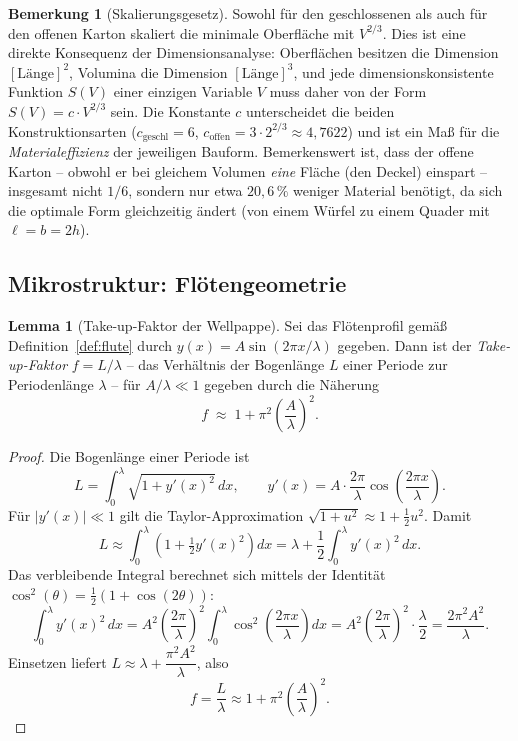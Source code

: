 ﻿\documentclass[a4paper,12pt]{article}
\theoremstyle{definition}
\newtheorem{lemma}{Lemma}
\newtheorem{bemerkung}{Bemerkung}
\begin{document}
\begin{bemerkung}[Skalierungsgesetz]
	Sowohl für den geschlossenen als auch für den offenen Karton skaliert die
	minimale Oberfläche mit $V^{2/3}$. Dies ist eine direkte Konsequenz der
	Dimensionsanalyse: Oberflächen besitzen die Dimension $[\text{Länge}]^2$,
	Volumina die Dimension $[\text{Länge}]^3$, und jede dimensionskonsistente
	Funktion $S(V)$ einer einzigen Variable $V$ muss daher von der Form
	$S(V) = c \cdot V^{2/3}$ sein. Die Konstante $c$ unterscheidet die beiden
	Konstruktionsarten ($c_{\mathrm{geschl}} = 6$, $c_{\mathrm{offen}} = 3 \cdot
	2^{2/3} \approx 4{,}7622$) und ist ein Maß für die \emph{Materialeffizienz}
	der jeweiligen Bauform. Bemerkenswert ist, dass der offene Karton -- obwohl
	er bei gleichem Volumen \emph{eine} Fläche (den Deckel) einspart --
	insgesamt nicht $1/6$, sondern nur etwa $20{,}6\,\%$ weniger Material
	benötigt, da sich die optimale Form gleichzeitig ändert (von einem Würfel zu
	einem Quader mit $\ell = b = 2h$).
\end{bemerkung}

\subsection{Mikrostruktur: Flötengeometrie}

\begin{lemma}[Take-up-Faktor der Wellpappe]
	\label{lem:takeup}
	Sei das Flötenprofil gemäß Definition~\ref{def:flute} durch
	$y(x) = A\sin(2\pi x/\lambda)$ gegeben. Dann ist der
	\emph{Take-up-Faktor} $f = L/\lambda$ -- das Verhältnis der Bogenlänge $L$
	einer Periode zur Periodenlänge $\lambda$ -- für $A/\lambda \ll 1$ gegeben
	durch die Näherung
	\[
		f \;\approx\; 1 + \pi^2 \left(\frac{A}{\lambda}\right)^2.
	\]
\end{lemma}

\begin{proof}
	Die Bogenlänge einer Periode ist
	\[
		L = \int_0^\lambda \sqrt{1 + y'(x)^2}\,dx, \qquad
		y'(x) = A \cdot \frac{2\pi}{\lambda}\cos\!\left(\frac{2\pi x}{\lambda}\right).
	\]
	Für $|y'(x)| \ll 1$ gilt die Taylor-Approximation
	$\sqrt{1+u^2} \approx 1 + \tfrac{1}{2}u^2$. Damit
	\[
		L \approx \int_0^\lambda \left(1 + \tfrac{1}{2}y'(x)^2\right) dx
		= \lambda + \frac{1}{2}\int_0^\lambda y'(x)^2\,dx.
	\]
	Das verbleibende Integral berechnet sich mittels der Identität
	$\cos^2(\theta) = \tfrac{1}{2}(1+\cos(2\theta))$:
	\[
		\int_0^\lambda y'(x)^2\,dx
		= A^2 \left(\frac{2\pi}{\lambda}\right)^2
		\int_0^\lambda \cos^2\!\left(\frac{2\pi x}{\lambda}\right) dx
		= A^2 \left(\frac{2\pi}{\lambda}\right)^2 \cdot \frac{\lambda}{2}
		= \frac{2\pi^2 A^2}{\lambda}.
	\]
	Einsetzen liefert
	$L \approx \lambda + \dfrac{\pi^2 A^2}{\lambda}$, also
	\[
		f = \frac{L}{\lambda} \approx 1 + \pi^2\left(\frac{A}{\lambda}\right)^2.
	\]
\end{proof}
\end{document}
